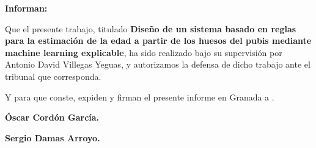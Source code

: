 \vspace{1cm}

\textbf{Informan:}

\vspace{1cm}

Que el presente trabajo, titulado \textbf{Diseño de un sistema basado en reglas para la estimación de la edad a partir de los huesos del pubis mediante machine learning explicable}, ha sido realizado bajo su supervisión por Antonio David Villegas Yeguas, y autorizamos la defensa de dicho trabajo ante el tribunal que corresponda.

\vspace{1cm}

Y para que conste, expiden y firman el presente informe en Granada a \thedate.

\vspace{4cm}

\textbf{Óscar Cordón García.}

\textbf{Sergio Damas Arroyo.}

%

\vspace*{2cm}

